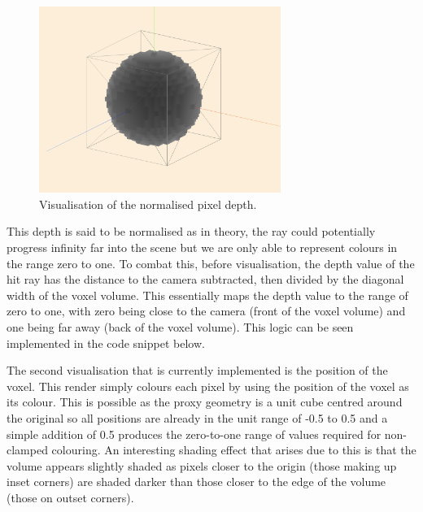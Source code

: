 \documentclass[titlepage]{article}
\begin{document}
\begin{figure}[htp]
  \centering
  \includegraphics[width=0.7\textwidth]{depth.png}
  \caption{Visualisation of the normalised pixel depth.}
\end{figure}
\FloatBarrier

This depth is said to be normalised as in theory, the ray could potentially progress infinity far into the scene but we are only able to represent colours in the range zero to one. To combat this, before visualisation, the depth value of the hit ray has the distance to the camera subtracted, then divided by the diagonal width of the voxel volume. This essentially maps the depth value to the range of zero to one, with zero being close to the camera (front of the voxel volume) and one being far away (back of the voxel volume). This logic can be seen implemented in the code snippet below.



The second visualisation that is currently implemented is the position of the voxel. This render simply colours each pixel by using the position of the voxel as its colour. This is possible as the proxy geometry is a unit cube centred around the original so all positions are already in the unit range of -0.5 to 0.5 and a simple addition of 0.5 produces the zero-to-one range of values required for non-clamped colouring. An interesting shading effect that arises due to this is that the volume appears slightly shaded as pixels closer to the origin (those making up inset corners) are shaded darker than those closer to the edge of the volume (those on outset corners).
\end{document}

